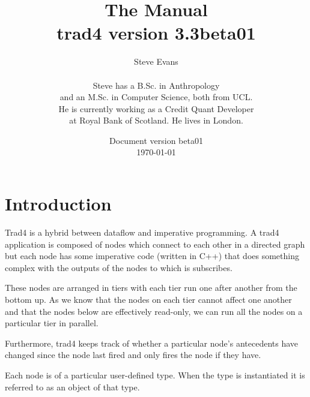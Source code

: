 \documentclass{report}
\begin{document}
\title{The Manual \\
{\large \textbf{trad4 version 3.3beta01}}}

\author{Steve Evans \\\\ Steve has a B.Sc. in Anthropology \\ and an M.Sc. in Computer Science, both from UCL. \\ He is currently working as a Credit Quant Developer \\ at Royal Bank of Scotland. He lives in London.}

\date{Document version beta01 \\
\today}

\maketitle



\setcounter{tocdepth}{1}
\tableofcontents

\chapter{Introduction}

Trad4 is a hybrid between dataflow and imperative programming. A trad4 application is composed of nodes which connect to each other in a directed graph but each node has some imperative code (written in C++) that does something complex with the outputs of the nodes to which is subscribes.

These nodes are arranged in tiers with each tier run one after another from the bottom up. As we know that the nodes on each tier cannot affect one another and that the nodes below are effectively read-only, we can run all the nodes on a particular tier in parallel.

Furthermore, trad4 keeps track of whether a particular node's antecedents have changed since the node last fired and only fires the node if they have.

Each node is of a particular user-defined type. When the type is instantiated it is referred to as an object of that type.
\end{document}
